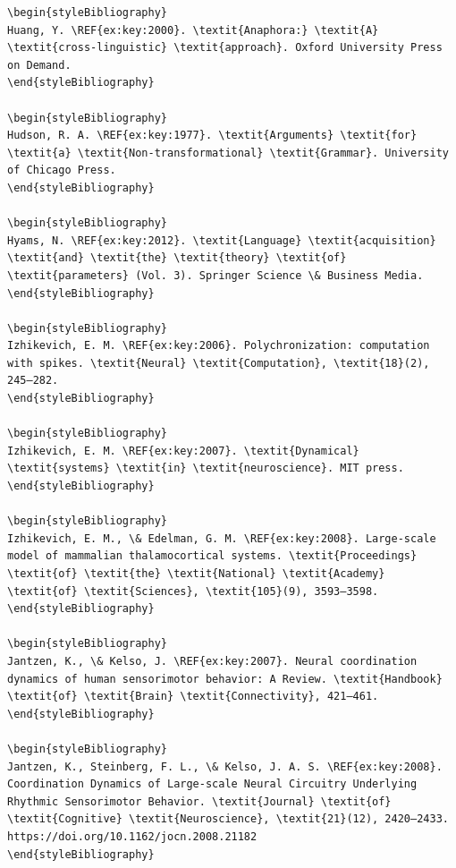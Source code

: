 \begin{verbatim}
\begin{styleBibliography}
Huang, Y. \REF{ex:key:2000}. \textit{Anaphora:} \textit{A} \textit{cross-linguistic} \textit{approach}. Oxford University Press on Demand.
\end{styleBibliography}

\begin{styleBibliography}
Hudson, R. A. \REF{ex:key:1977}. \textit{Arguments} \textit{for} \textit{a} \textit{Non-transformational} \textit{Grammar}. University of Chicago Press.
\end{styleBibliography}

\begin{styleBibliography}
Hyams, N. \REF{ex:key:2012}. \textit{Language} \textit{acquisition} \textit{and} \textit{the} \textit{theory} \textit{of} \textit{parameters} (Vol. 3). Springer Science \& Business Media.
\end{styleBibliography}

\begin{styleBibliography}
Izhikevich, E. M. \REF{ex:key:2006}. Polychronization: computation with spikes. \textit{Neural} \textit{Computation}, \textit{18}(2), 245–282.
\end{styleBibliography}

\begin{styleBibliography}
Izhikevich, E. M. \REF{ex:key:2007}. \textit{Dynamical} \textit{systems} \textit{in} \textit{neuroscience}. MIT press.
\end{styleBibliography}

\begin{styleBibliography}
Izhikevich, E. M., \& Edelman, G. M. \REF{ex:key:2008}. Large-scale model of mammalian thalamocortical systems. \textit{Proceedings} \textit{of} \textit{the} \textit{National} \textit{Academy} \textit{of} \textit{Sciences}, \textit{105}(9), 3593–3598.
\end{styleBibliography}

\begin{styleBibliography}
Jantzen, K., \& Kelso, J. \REF{ex:key:2007}. Neural coordination dynamics of human sensorimotor behavior: A Review. \textit{Handbook} \textit{of} \textit{Brain} \textit{Connectivity}, 421–461.
\end{styleBibliography}

\begin{styleBibliography}
Jantzen, K., Steinberg, F. L., \& Kelso, J. A. S. \REF{ex:key:2008}. Coordination Dynamics of Large-scale Neural Circuitry Underlying Rhythmic Sensorimotor Behavior. \textit{Journal} \textit{of} \textit{Cognitive} \textit{Neuroscience}, \textit{21}(12), 2420–2433. https://doi.org/10.1162/jocn.2008.21182
\end{styleBibliography}


\end{verbatim}
